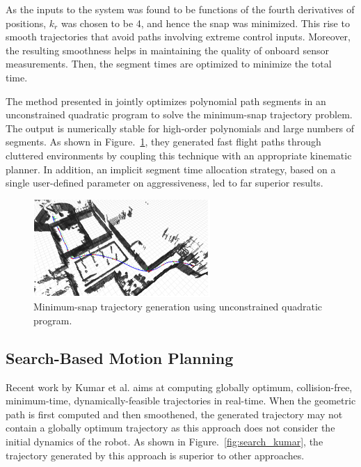 As the inputs to the system was found to be functions of the fourth derivatives of positions, $k_r$ was chosen to be 4, and hence the snap was minimized. This rise to smooth trajectories that avoid paths involving extreme control inputs. Moreover, the resulting smoothness helps in maintaining the quality of onboard sensor measurements. Then, the segment times are optimized to minimize the total time. 

The method presented in  \cite{richter2016polynomial} jointly optimizes polynomial path segments in an unconstrained quadratic program to solve the minimum-snap trajectory problem. The output is numerically stable for high-order polynomials and large numbers of segments. As shown in Figure.~\ref{fig:bry_poly}, they generated fast flight paths through cluttered environments by coupling this technique with an appropriate kinematic planner. In addition, an implicit segment time allocation strategy, based on a single user-defined parameter on aggressiveness, led to far superior results.

\begin{figure}[h!]
\centering
\includegraphics[width=0.6\textwidth]{./images/bry_poly.png}
\caption{Minimum-snap trajectory generation using unconstrained quadratic program. \cite{richter2016polynomial}}
\label{fig:bry_poly}
\end{figure}


\subsection{Search-Based Motion Planning}
\label{sec:search_based_planning}
Recent work by Kumar et al. \cite{kumar2017search} aims at computing globally optimum, collision-free, minimum-time, dynamically-feasible trajectories in real-time. When the geometric path is first computed and then smoothened, the generated trajectory may not contain a globally optimum trajectory as this approach does not consider the initial dynamics of the robot. As shown in Figure.~\ref{fig:search_kumar}, the trajectory generated by this approach is superior to other approaches. 

